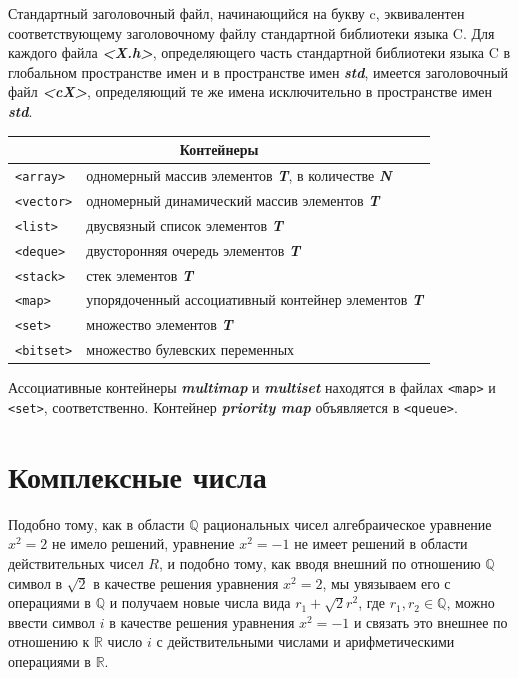 \documentclass[a4paper, 12pt]{article} %
\begin{document}
Стандартный заголовочный файл, начинающийся на букву c, эквивалентен соответствующему заголовочному файлу стандартной библиотеки языка C. Для каждого файла \textbf{\textit{<X.h>}}, определяющего часть стандартной библиотеки языка C в глобальном пространстве имен и в пространстве имен \textbf{\textit{std}}, имеется заголовочный файл \textbf{\textit{<cX>}}, определяющий те же имена исключительно в пространстве имен \textbf{\textit{std}}.
\begin{center}
    \begin{tabular}{ | l | l | }
        \hline
        \multicolumn{2}{|c|}{Контейнеры}                                                                      \\ \hline
        \texttt{<array>}  & одномерный массив элементов \textbf{\textit{T}}, в количестве \textbf{\textit{N}} \\ \hline
        \texttt{<vector>} & одномерный динамический массив элементов \textbf{\textit{T}}                      \\ \hline
        \texttt{<list>}   & двусвязный список элементов \textbf{\textit{T}}                                   \\ \hline
        \texttt{<deque>}  & двусторонняя очередь элементов \textbf{\textit{T}}                                \\ \hline
        \texttt{<stack>}  & стек элементов \textbf{\textit{T}}                                                \\ \hline
        \texttt{<map>}    & упорядоченный ассоциативный контейнер элементов \textbf{\textit{T}}               \\ \hline
        \texttt{<set>}    & множество элементов \textbf{\textit{T}}                                           \\ \hline
        \texttt{<bitset>} & множество булевских переменных                                                    \\ \hline
    \end{tabular}
\end{center}

Ассоциативные контейнеры \textbf{\textit{multimap}} и \textbf{\textit{multiset}} находятся в файлах \texttt{<map>} и \texttt{<set>}, соответственно. Контейнер \textbf{\textit{priority map}} объявляется в \texttt{<queue>}.

\clearpage


\clearpage
\section*{Компле$\acute{}$ксные числа}
Подобно тому, как в области $\mathbb{Q}$ рациональных чисел алгебраическое уравнение $x^2 = 2$ не имело решений, уравнение $x^2 = -1$ не имеет решений в области действительных чисел $R$, и подобно тому, как вводя внешний по отношению $\mathbb{Q}$ символ в $\sqrt{2}$ в качестве решения уравнения $x^2 = 2$, мы увязываем его с операциями в $\mathbb{Q}$ и получаем новые числа вида $r_1 + \sqrt{2}r^2$, где $r_1, r_2 \in \mathbb{Q}$, можно ввести символ $i$ в качестве решения уравнения $x^2 = -1$ и связать это внешнее по отношению к $\mathbb{R}$ число $i$ с действительными числами и арифметическими операциями в $\mathbb{R}$.
\end{document}
